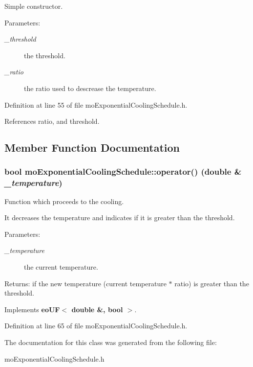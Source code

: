 Simple constructor. 

\begin{Desc}
\item[Parameters:]
\begin{description}
\item[{\em \_\-threshold}]the threshold. \item[{\em \_\-ratio}]the ratio used to descrease the temperature. \end{description}
\end{Desc}


Definition at line 55 of file mo\-Exponential\-Cooling\-Schedule.h.

References ratio, and threshold.

\subsection{Member Function Documentation}
\subsubsection{\setlength{\rightskip}{0pt plus 5cm}bool mo\-Exponential\-Cooling\-Schedule::operator() (double \& {\em \_\-temperature})\hspace{0.3cm}{\tt  [inline, virtual]}}\label{classmo_exponential_cooling_schedule_a1}


Function which proceeds to the cooling. 

It decreases the temperature and indicates if it is greater than the threshold.

\begin{Desc}
\item[Parameters:]
\begin{description}
\item[{\em \_\-temperature}]the current temperature. \end{description}
\end{Desc}
\begin{Desc}
\item[Returns:]if the new temperature (current temperature $\ast$ ratio) is greater than the threshold. \end{Desc}


Implements {\bf eo\-UF$<$ double \&, bool $>$}.

Definition at line 65 of file mo\-Exponential\-Cooling\-Schedule.h.

The documentation for this class was generated from the following file:\begin{CompactItemize}
\item 
mo\-Exponential\-Cooling\-Schedule.h\end{CompactItemize}
